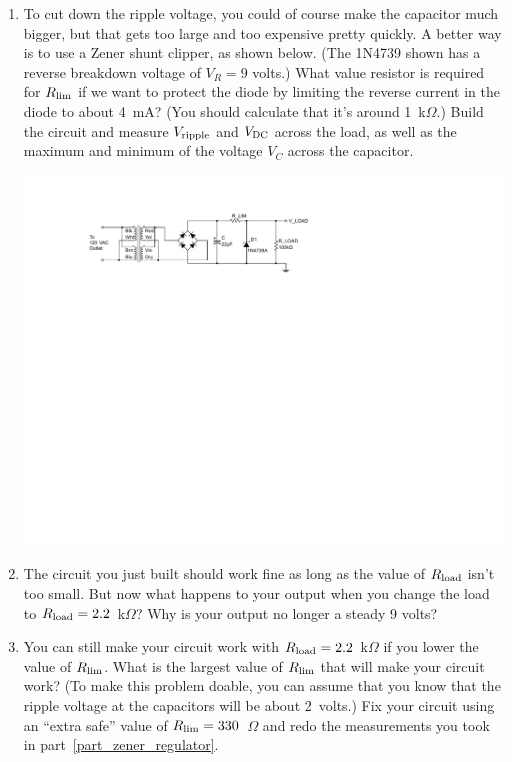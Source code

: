 \begin{enumerate}[wide]
\item To cut down the ripple voltage, you could of course make the capacitor much bigger, but that gets too large and too expensive pretty quickly.  A better way is to use a Zener shunt clipper, as shown below.  (The 1N4739 shown has a reverse breakdown voltage of $V_R=9$ volts.)  What value resistor is required for $R_{\rm lim}$ if we want to protect the diode by limiting the reverse current in the diode to about 4~mA?  (You should calculate that it's around 1~k$\Omega$.) Build the circuit and measure $V_{\rm ripple}$ and $V_{\rm DC}$ across the load, as well as the maximum and minimum of the voltage $V_C$ across the capacitor.  \label{part_zener_regulator}
\begin{center}
\includegraphics{power_supply/zener_regulator.pdf}
\end{center}

\item The circuit you just built should work fine as long as the value of $R_{\rm load}$ isn't too small.  But now what happens to your output when you change the load to $R_{\rm load} = 2.2$~k$\Omega$?  Why is your output no longer a steady 9 volts?

\item You can still make your circuit work with $R_{\rm load} = 2.2$~k$\Omega$ if you lower the value of $R_{\rm lim}$.  What is the largest value of $R_{\rm lim}$ that will make your circuit work?  (To make this problem doable, you can assume that you know that the ripple voltage at the capacitors will be about 2~volts.)  Fix your circuit using an ``extra safe'' value of $R_{\rm lim}=330$~$\Omega$ and redo the measurements you took in part~\ref{part_zener_regulator}.  \label{part_small_rlim}


\end{enumerate}
